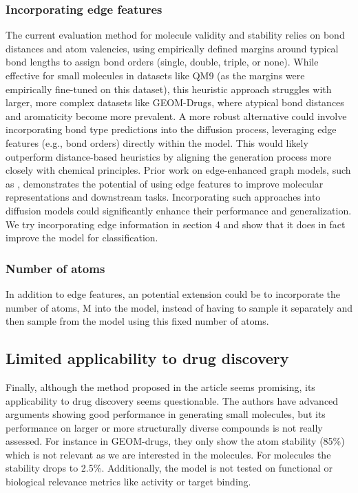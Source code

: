\documentclass[sigconf]{acmart}
\begin{document}
\subsubsection{Incorporating edge features}
The current evaluation method for molecule validity and stability relies on bond distances and atom valencies, using empirically defined margins around typical bond lengths to assign bond orders (single, double, triple, or none). While effective for small molecules in datasets like QM9 (as the margins were empirically fine-tuned on this dataset), this heuristic approach struggles with larger, more complex datasets like GEOM-Drugs, where atypical bond distances and aromaticity become more prevalent. A more robust alternative could involve incorporating bond type predictions into the diffusion process, leveraging edge features (e.g., bond orders) directly within the model. This would likely outperform distance-based heuristics by aligning the generation process more closely with chemical principles. Prior work on edge-enhanced graph models, such as \cite{gilmer2017neuralmessagepassingquantum}, demonstrates the potential of using edge features to improve molecular representations and downstream tasks. Incorporating such approaches into diffusion models could significantly enhance their performance and generalization. We try incorporating edge information in section 4 and show that it does in fact improve the model for classification.
\subsubsection{Number of atoms}
In addition to edge features, an potential extension could be to incorporate the number of atoms, M into the model, instead of having to sample it separately and then sample from the model using this fixed number of atoms.

\subsection{Limited applicability to drug discovery}
Finally, although the method proposed in the article seems promising, its applicability to drug discovery seems questionable. The authors have advanced arguments showing good performance in generating small molecules, but its performance on larger or more structurally diverse compounds is not really assessed. For instance in GEOM-drugs, they only show the atom stability (85\%) which is not relevant as we are interested in the molecules. For molecules the stability drops to 2.5\%.
Additionally, the model is not tested on functional or biological relevance metrics like activity or target binding. 
\end{document}
